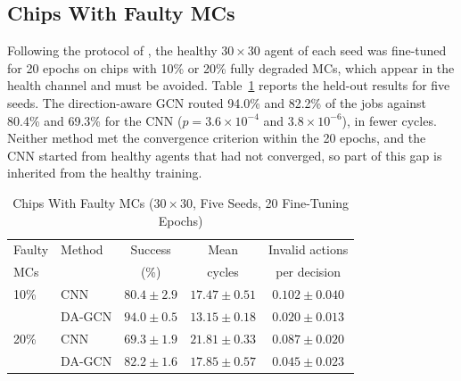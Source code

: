 \documentclass[conference,onecolumn,11pt]{IEEEtran}
\begin{document}
\subsection{Chips With Faulty MCs}
Following the protocol of \cite[Fig.~8]{elfar2023}, the healthy $30\times30$ agent of each
seed was fine-tuned for 20 epochs on chips with 10\% or 20\% fully degraded MCs, which appear
in the health channel and must be avoided. Table~\ref{tab:faults} reports the held-out
results for five seeds. The direction-aware GCN routed 94.0\% and 82.2\% of the jobs against
80.4\% and 69.3\% for the CNN ($p=3.6\times10^{-4}$ and $3.8\times10^{-6}$), in fewer cycles.
Neither method met the convergence criterion within the 20 epochs, and the CNN started from
healthy agents that had not converged, so part of this gap is inherited from the healthy
training.

\begin{table}[!htbp]
\caption{Chips With Faulty MCs ($30\times30$, Five Seeds, 20 Fine-Tuning Epochs)}
\label{tab:faults}
\centering\footnotesize
\setlength{\tabcolsep}{3pt}
\begin{tabular}{@{}llccc@{}}
\toprule
Faulty & Method & Success & Mean & Invalid actions \\
MCs & & (\%) & cycles & per decision \\ \midrule
10\% & CNN & $80.4\pm2.9$ & $17.47\pm0.51$ & $0.102\pm0.040$ \\
 & DA-GCN & $\mathbf{94.0\pm0.5}$ & $\mathbf{13.15\pm0.18}$ & $\mathbf{0.020\pm0.013}$ \\ \midrule
20\% & CNN & $69.3\pm1.9$ & $21.81\pm0.33$ & $0.087\pm0.020$ \\
 & DA-GCN & $\mathbf{82.2\pm1.6}$ & $\mathbf{17.85\pm0.57}$ & $\mathbf{0.045\pm0.023}$ \\
\bottomrule
\end{tabular}
\end{table}
\end{document}
